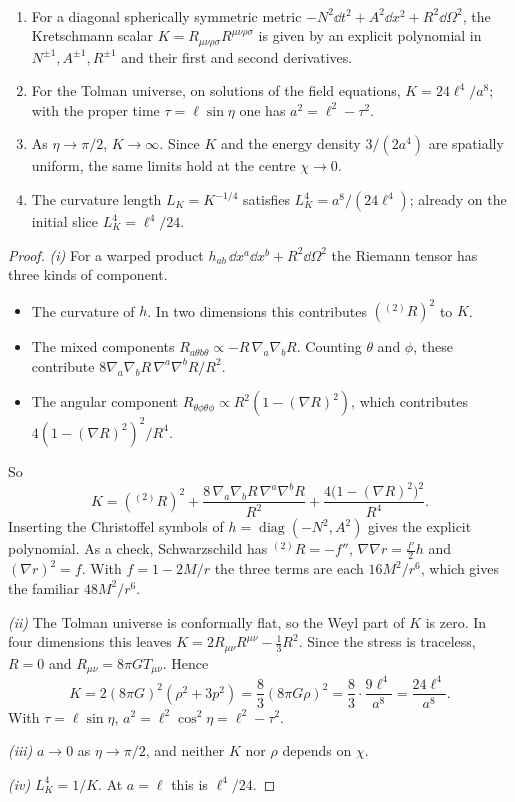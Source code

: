 \begin{theorem}\label{thm:crunch}\ver\
\begin{enumerate}[label=(\roman*)]
\item For a diagonal spherically symmetric metric $-N^2\dd t^2+A^2\dd x^2+R^2\dd\Omega^2$, the Kretschmann scalar $K=R_{\mu\nu\rho\sigma}R^{\mu\nu\rho\sigma}$ is given by an explicit polynomial in $N^{\pm1},A^{\pm1},R^{\pm1}$ and their first and second derivatives.
\item For the Tolman universe, on solutions of the field equations, $K=24\ell^4/a^8$; with the proper time $\tau=\ell\sin\eta$ one has $a^2=\ell^2-\tau^2$.
\item As $\eta\to\pi/2$, $K\to\infty$. Since $K$ and the energy density $3/(2a^4)$ are spatially uniform, the same limits hold at the centre $\chi\to0$.
\item The curvature length $L_K=K^{-1/4}$ satisfies $L_K^4=a^8/(24\ell^4)$; already on the initial slice $L_K^4=\ell^4/24$.
\end{enumerate}
\end{theorem}
\begin{proof}
\emph{(i)} For a warped product $h_{ab}\,\dd x^a\dd x^b+R^2\dd\Omega^2$ the Riemann tensor has three kinds of component.
\begin{itemize}[nosep]
\item The curvature of $h$. In two dimensions this contributes $({}^{(2)}\!R)^2$ to $K$.
\item The mixed components $R_{a\theta b\theta}\propto-R\,\nabla_a\nabla_bR$. Counting $\theta$ and $\phi$, these contribute $8\nabla_a\nabla_bR\,\nabla^a\nabla^bR/R^2$.
\item The angular component $R_{\theta\phi\theta\phi}\propto R^2(1-(\nabla R)^2)$, which contributes $4(1-(\nabla R)^2)^2/R^4$.
\end{itemize}
So
\[
K=({}^{(2)}\!R)^2+\frac{8\,\nabla_a\nabla_bR\,\nabla^a\nabla^bR}{R^2}+\frac{4\bigl(1-(\nabla R)^2\bigr)^2}{R^4}.
\]
Inserting the Christoffel symbols of $h=\operatorname{diag}(-N^2,A^2)$ gives the explicit polynomial. As a check, Schwarzschild has ${}^{(2)}\!R=-f''$, $\nabla\nabla r=\frac{f'}2h$ and $(\nabla r)^2=f$. With $f=1-2M/r$ the three terms are each $16M^2/r^6$, which gives the familiar $48M^2/r^6$.

\emph{(ii)} The Tolman universe is conformally flat, so the Weyl part of $K$ is zero. In four dimensions this leaves $K=2R_{\mu\nu}R^{\mu\nu}-\frac13R^2$. Since the stress is traceless, $R=0$ and $R_{\mu\nu}=8\pi GT_{\mu\nu}$. Hence
\[
K=2(8\pi G)^2(\rho^2+3p^2)=\frac83(8\pi G\rho)^2=\frac83\cdot\frac{9\ell^4}{a^8}=\frac{24\ell^4}{a^8}.
\]
With $\tau=\ell\sin\eta$, $a^2=\ell^2\cos^2\eta=\ell^2-\tau^2$.

\emph{(iii)} $a\to0$ as $\eta\to\pi/2$, and neither $K$ nor $\rho$ depends on $\chi$.

\emph{(iv)} $L_K^4=1/K$. At $a=\ell$ this is $\ell^4/24$.
\end{proof}


